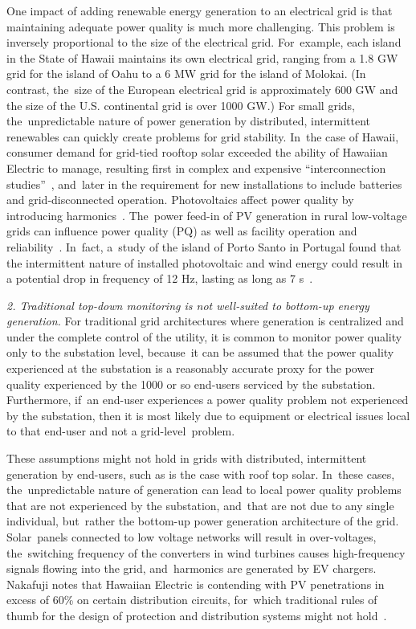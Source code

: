 \documentclass[energies,article,accept,moreauthors,pdftex]{Definitions/mdpi}
\begin{document}
One impact of adding renewable energy generation to an electrical grid is that maintaining adequate power quality is much more challenging. This problem is inversely proportional to the size of the electrical grid. For~example, each island in the State of Hawaii maintains its own electrical grid, ranging from a 1.8 GW grid for the island of Oahu to a 6 MW grid for the island of Molokai. (In contrast, the~size of the European electrical grid is approximately 600 GW and the size of the U.S. continental grid is over 1000 GW.) For small grids, the~unpredictable nature of power generation by distributed, intermittent renewables can quickly create problems for grid stability. In~the case of Hawaii, consumer demand for grid-tied rooftop solar exceeded the ability of Hawaiian Electric to manage, resulting first in complex and expensive ``interconnection studies''~\cite{trabish_solar_2014,anastasi_energy_2009}, and~later in the requirement for new installations to include batteries and grid-disconnected operation. Photovoltaics affect power quality by introducing harmonics~\cite{anurangi_effects_2017}. The~power feed-in of PV generation in rural low-voltage grids can influence power quality (PQ) as well as facility operation and reliability~\cite{rita_pinto_impact_2016}. In~fact, a~study of the island of Porto Santo in Portugal found that the intermittent nature of installed photovoltaic and wind energy could result in a potential drop in frequency of 12 Hz, lasting as long as 7 s~\cite{delgado_solutions_2011}.

{\em 2. Traditional top-down monitoring is not well-suited to bottom-up energy generation.} For traditional grid architectures where generation is centralized and under the complete control of the utility, it is common to monitor power quality only to the substation level, because~it can be assumed that the power quality experienced at the substation is a reasonably accurate proxy for the power quality experienced by the 1000 or so end-users serviced by the substation. Furthermore, if~an end-user experiences a power quality problem not experienced by the substation, then it is most likely due to equipment or electrical issues local to that end-user and not a grid-level~problem.

These assumptions might not hold in grids with distributed, intermittent generation by end-users, such as is the case with roof top solar. In~these cases, the~unpredictable nature of generation can lead to local power quality problems that are not experienced by the substation, and~that are not due to any single individual, but~rather the bottom-up power generation architecture of the grid. Solar~panels connected to low voltage networks will result in over-voltages, the~switching frequency of the converters in wind turbines causes high-frequency signals flowing into the grid, and~harmonics are generated by EV chargers.~\cite{zavoda_power_2018}
Nakafuji notes that Hawaiian Electric is contending with PV penetrations in excess of 60\% on certain distribution circuits, for~which traditional rules of thumb for the design of protection and distribution systems might not hold~\cite{nakafuji_back--basics_2011}.
\end{document}
